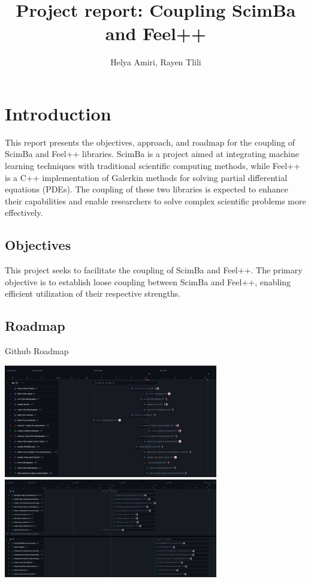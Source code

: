 \documentclass{article}
\title{Project report: Coupling ScimBa and Feel++}
\author{Helya Amiri, Rayen Tlili}
\date{}
\begin{document}
\maketitle

\tableofcontents
\newpage


\section{Introduction}

This report presents the objectives, approach, and roadmap for the coupling of ScimBa and Feel++ libraries. ScimBa is a project aimed at integrating machine learning techniques with traditional scientific computing methods, while Feel++ is a C++ implementation of Galerkin methods for solving partial differential equations (PDEs). The coupling of these two libraries is expected to enhance their capabilities and enable researchers to solve complex scientific problems more effectively.



\subsection{Objectives}

This project seeks to facilitate the coupling of ScimBa and Feel++.
The primary objective is to establish loose coupling between ScimBa and Feel++, enabling efficient utilization of their respective strengths.

\subsection{Roadmap}
\begin{frame}{Github Roadmap}
    \begin{center}
        \includegraphics[width=0.7\textwidth]{images/roadmap1.png}
        \vspace{1em} %
        \includegraphics[width=0.7\textwidth]{images/roadmap2.png}
    \end{center}
\end{frame}
\end{document}
